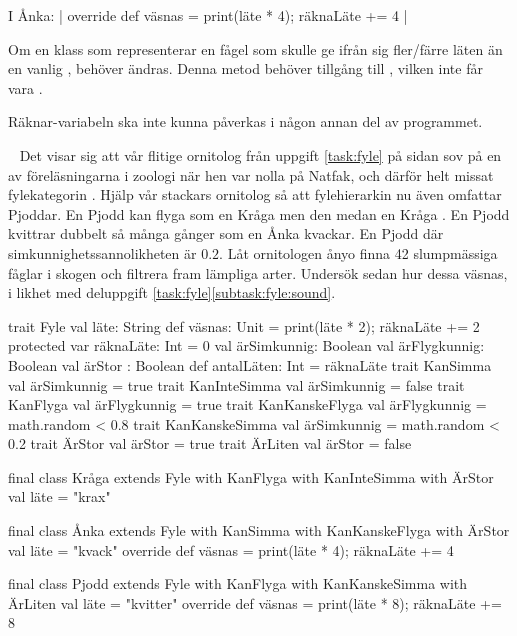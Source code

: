 I Ånka: \code| override def väsnas = { print(läte * 4); räknaLäte += 4 }|

\SubtaskSolved  {}

\SubtaskSolved  Om en klass som representerar en fågel som skulle ge ifrån sig fler/färre läten än en vanlig , behöver  ändras. Denna metod behöver tillgång till , vilken inte får vara .

\SubtaskSolved  Räknar-variabeln ska inte kunna påverkas i någon annan del av programmet.


\QUESTEND






\QUESTBEGIN

\Task  \what~ Det visar sig att vår flitige ornitolog från uppgift \ref{task:fyle} på sidan \pageref{task:fyle} sov på en av föreläsningarna i zoologi när hen var nolla på Natfak, och därför helt missat fylekategorin . Hjälp vår stackars ornitolog så att fylehierarkin nu även omfattar Pjoddar. En Pjodd kan flyga som en Kråga men den  medan en Kråga . En Pjodd kvittrar dubbelt så många gånger som en Ånka kvackar. En Pjodd  där simkunnighetssannolikheten är $0.2$. Låt ornitologen ånyo finna 42 slumpmässiga fåglar i skogen och filtrera fram lämpliga arter. Undersök sedan hur dessa väsnas, i likhet med deluppgift \ref{task:fyle}\ref{subtask:fyle:sound}.


\SOLUTION

\TaskSolved \what


\begin{Code}
trait Fyle {
  val läte: String
  def väsnas: Unit = { print(läte * 2); räknaLäte += 2 }
  protected var räknaLäte: Int = 0
  val ärSimkunnig: Boolean
  val ärFlygkunnig: Boolean
  val ärStor : Boolean
  def antalLäten: Int = räknaLäte
}
trait KanSimma { val ärSimkunnig = true }
trait KanInteSimma { val ärSimkunnig = false }
trait KanFlyga { val ärFlygkunnig = true }
trait KanKanskeFlyga { val ärFlygkunnig = math.random < 0.8 }
trait KanKanskeSimma { val ärSimkunnig = math.random < 0.2 }
trait ÄrStor { val ärStor = true }
trait ÄrLiten { val ärStor = false }

final class Kråga
  extends Fyle
  with KanFlyga
  with KanInteSimma
  with ÄrStor{
  val läte = "krax"
}

final class Ånka
  extends Fyle
  with KanSimma
  with KanKanskeFlyga
  with ÄrStor{
  val läte = "kvack"
  override def väsnas = { print(läte * 4); räknaLäte += 4 }
}

final class Pjodd
  extends Fyle
  with KanFlyga
  with KanKanskeSimma
  with ÄrLiten{
  val läte = "kvitter"
  override def väsnas = { print(läte * 8); räknaLäte += 8 }
}
\end{Code}

